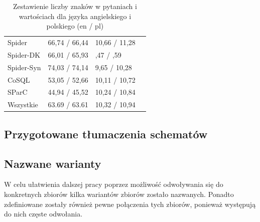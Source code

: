 \begin{table}[ht]
    \centering
    \begin{tabular}{|l|R{0.15\textwidth}|R{0.15\textwidth}|R{0.15\textwidth}|}
        \hline
         &  &  \\
        \hline
        Spider & 66,74 / 66,44 & 10,66 / 11,28 \\
        \hline
        Spider-DK & 66,01 / 65,93 & ,47 / ,59 \\
        \hline
        Spider-Syn & 74,03 / 74,14 & 9,65 / 10,28 \\
        \hline
        CoSQL & 53,05 / 52,66 & 10,11 / 10,72 \\
        \hline
        SParC & 44,94 / 45,52 & 10,24 / 10,84 \\
        \hhline{|=|=|=|} 
        Wszystkie & 63.69 / 63.61 & 10,32 / 10,94 \\
        \hline
    \end{tabular}
    \caption[Zestawienie liczby znaków w pytaniach i wartościach dla języka angielskiego i polskiego]{Zestawienie liczby znaków w pytaniach i wartościach dla języka angielskiego i polskiego (en / pl)}
    \label{tab:questions-lengths}
\end{table}

\subsection{Przygotowane tłumaczenia schematów}


\subsection{Nazwane warianty}


W celu ułatwienia dalszej pracy poprzez możliwość odwoływania się do konkretnych zbiorów kilka wariantów zbiorów zostało nazwanych. Ponadto zdefiniowane zostały również pewne połączenia tych zbiorów, ponieważ występują do nich częste odwołania.

